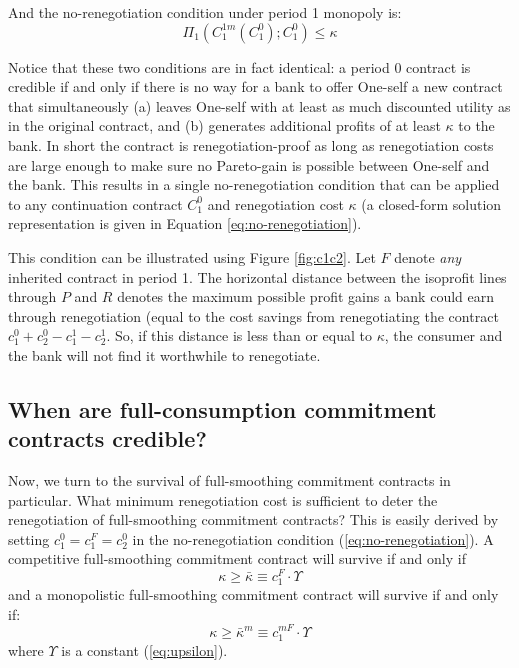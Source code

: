 \documentclass[11pt,english]{article}
\theoremstyle{plain}
\theoremstyle{definition}
\begin{document}
And the no-renegotiation condition under period 1 monopoly is: 
\begin{equation}
\Pi_{1}(C_{1}^{1m}\left(C_{1}^{0}\right);C_{1}^{0})\leq\kappa\label{eq:no-reg-monop}
\end{equation}

Notice that these two conditions are in fact identical: a period 0
contract is credible if and only if there is no way for a bank to
offer One-self a new contract that simultaneously (a) leaves One-self
with at least as much discounted utility as in the original contract,
and (b) generates additional profits of at least $\kappa$ to the
bank. In short the contract is renegotiation-proof as long as renegotiation
costs are large enough to make sure no Pareto-gain is possible between
One-self and the bank. This results in a single no-renegotiation condition
that can be applied to any continuation contract $C_{1}^{0}$ and
renegotiation cost $\kappa$ (a closed-form solution representation
is given in Equation \ref{eq:no-renegotiation}).

This condition can be illustrated using Figure \ref{fig:c1c2}.
Let $F$ denote \textit{any} inherited contract
in period 1. The horizontal distance between the isoprofit lines through
$P$ and $R$ denotes the maximum possible profit gains a bank could
earn through renegotiation (equal to the cost savings from renegotiating
the contract $c_{1}^{0}+c_{2}^{0}-c_{1}^{1}-c_{2}^{1}$. So, if this
distance is less than or equal to $\kappa$, the consumer and the
bank will not find it worthwhile to renegotiate.


\subsection{When are full-consumption commitment contracts credible?}

Now, we turn to the survival of full-smoothing commitment contracts
in particular. What minimum renegotiation cost is sufficient to deter
the renegotiation of full-smoothing commitment contracts? This is
easily derived by setting $c_{1}^{0}=c_{1}^{F}=c_{2}^{0}$ in the
no-renegotiation condition (\ref{eq:no-renegotiation}). A competitive
full-smoothing commitment contract will survive if and only if 
\begin{equation}
\kappa\geq\bar{\kappa}\equiv c_{1}^{F}\cdot\Upsilon\label{eq:kbar}
\end{equation}
and a monopolistic full-smoothing commitment contract will survive
if and only if: 
\begin{equation}
\kappa\geq\bar{\kappa}^{m}\equiv c_{1}^{mF}\cdot\Upsilon\label{eq:kbarM}
\end{equation}
where $\Upsilon$ is a constant (\ref{eq:upsilon}).
\end{document}
